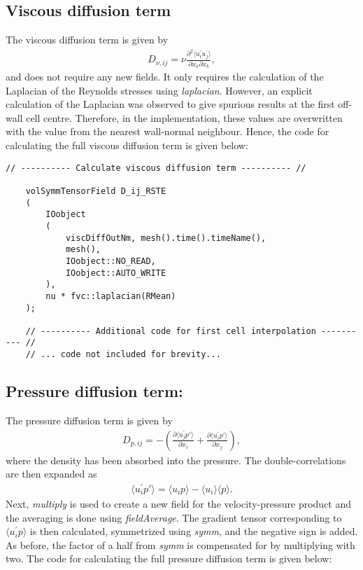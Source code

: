 \subsection{Viscous diffusion term}
\label{subsec:viscous_diffusion}

The viscous diffusion term is given by
\begin{align}
    D_{\nu,ij} = \nu \frac{\partial^2 \langle u^{\prime}_i u^{\prime}_j \rangle}{\partial x_k \partial x_k},
\end{align}
and does not require any new fields.
It only requires the calculation of the Laplacian of the Reynolds stresses using \emph{laplacian}.
However, an explicit calculation of the Laplacian was observed to give spurious results at the first off-wall cell centre.
Therefore, in the implementation, these values are overwritten with the value from the nearest wall-normal neighbour.
Hence, the \OF code for calculating the full viscous diffusion term is given below: 

\begin{lstlisting}[emph={ddt,div,laplacian}]
    // ---------- Calculate viscous diffusion term ---------- //

    volSymmTensorField D_ij_RSTE
    (
        IOobject
        (
            viscDiffOutNm, mesh().time().timeName(),
            mesh(),
            IOobject::NO_READ,
            IOobject::AUTO_WRITE
        ),
        nu * fvc::laplacian(RMean)
    );
    
    // ---------- Additional code for first cell interpolation ---------- //
    // ... code not included for brevity...
\end{lstlisting}

\subsection{Pressure diffusion term:}
\label{subsec:pressure_diffusion}

The pressure diffusion term is given by
\begin{align}
    D_{p,ij} = 
    - \left( \frac{\partial \langle u^{\prime}_j p' \rangle}{\partial x_i} + \frac{\partial \langle u^{\prime}_i p' \rangle}{\partial x_j} \right) , 
\end{align}
where the density has been absorbed into the pressure.
The double-correlations are then expanded as
\begin{align}
    \langle u^{\prime}_i p' \rangle 
    = 
    \langle u_i p \rangle - \langle u_i \rangle \langle p \rangle .
\end{align}
Next, \emph{multiply} is used to create a new field for the velocity-pressure product and the averaging is done using \emph{fieldAverage}.
The gradient tensor corresponding to $\langle u^{\prime}_i p \rangle$ is then calculated, symmetrized using \emph{symm}, and the negative sign is added.
As before, the factor of a half from \emph{symm} is compensated for by multiplying with two.
The \OF code for calculating the full pressure diffusion term is given below:

